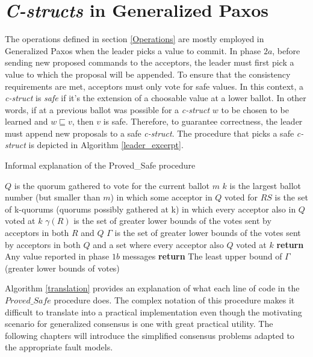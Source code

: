 \section{\textit{C-structs} in Generalized Paxos}
The operations defined in section \ref{Operations} are mostly employed in Generalized Paxos when the leader picks a value to commit. In phase $2a$, before sending new proposed commands to the acceptors, the leader must first pick a value to which the proposal will be appended. To ensure that the consistency requirements are met, acceptors must only vote for safe values. In this context, a \textit{c-struct} is \textit{safe} if it's the extension of a choosable value at a lower ballot. In other words, if at a previous ballot was possible for a \textit{c-struct} $w$ to be chosen to be learned and $w \sqsubseteq v$, then $v$ is safe. Therefore, to guarantee correctness, the leader must append new proposals to a safe \textit{c-struct}. The procedure that picks a safe \textit{c-struct} is depicted in Algorithm \ref{leader_excerpt}.\par


\begin{algorithm}
	\caption{Informal explanation of the Proved\_Safe procedure}
	\label{translation}
	\begin{algorithmic}[1]
		\State $Q$ is the quorum gathered to vote for the current ballot $m$
		\State $k$ is the largest ballot number (but smaller than $m$) in which some acceptor in $Q$ voted for 
		\State $RS$ is the set of k-quorums (quorums possibly gathered at k) in which every acceptor also in $Q$ voted at $k$
		\State $\gamma(R)$ is the set of greater lower bounds of the votes sent by acceptors in both $R$ and $Q$
		\State $\Gamma$ is the set of greater lower bounds of the votes sent by acceptors in both $Q$ and a set where every acceptor also $Q$ voted at $k$
		\State \textbf{return} Any value reported in phase $1b$ messages
		\Else
		\State \textbf{return} The least upper bound of $\Gamma$ (greater lower bounds of votes)
		\EndIf
		\EndFunction
		
	\end{algorithmic}
\end{algorithm}

Algorithm \ref{translation} provides an explanation of what each line of code in the $Proved\_Safe$ procedure does. The complex notation of this procedure makes it difficult to translate into a practical implementation even though the motivating scenario for generalized consensus is one with great practical utility. The following chapters will introduce the simplified consensus problems adapted to the appropriate fault models.

